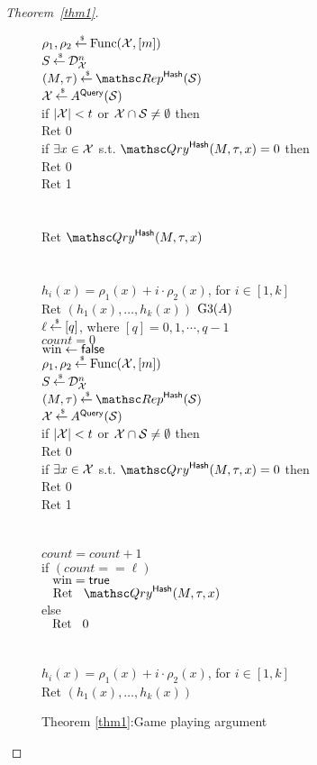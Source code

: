 \begin{proof}[Theorem~\ref{thm1}]
\begin{figure}
{{$\rho_1,\rho_2 {\:\stackrel{{\scriptscriptstyle \hspace{0.2em}\$}} {\leftarrow}\:} \mathrm{Func}({\cal X},[m])$\\
$S {\:\stackrel{{\scriptscriptstyle \hspace{0.2em}\$}} {\leftarrow}\:} \mathcal{D}_{{\cal X}}^{n}$\\
$(M,\tau) \getsr \Rep^{\HashOracle}(\calS)$\\
${\cal X} {\:\stackrel{{\scriptscriptstyle \hspace{0.2em}\$}} {\leftarrow}\:} A^{\mathsf{Query}}({\cal S})$\\
if $|{\cal X}| < t$ or ${\cal X} \cap {\cal S} \neq \emptyset$ then \\
\nudge Ret 0\\
if $\exists x \in {\cal X}$ s.t. $\Qry^{\HashOracle}(M,\tau,x)=0$ then\\
\nudge Ret 0\\
Ret 1\\\\
%
\\
Ret $\Qry^{\HashOracle}(M,\tau,x)$\\\\
%
\\
$h_i(x) = \rho_1(x)+i \cdot \rho_2(x)$, for $i\in[1,k]$\\
Ret $\left(h_1(x),\ldots,h_k(x)\right)$
}
{
\underline{$\text{G3}(A)$}\\
$\ell {\:\stackrel{{\scriptscriptstyle \hspace{0.2em}\$}} {\leftarrow}\:} [q]$, where $[q] = {0,1, \cdots, q-1}$\\
$count = 0$ \\%
$\mathrm{win} \gets \mathsf{false}$\\
$\rho_1,\rho_2 {\:\stackrel{{\scriptscriptstyle \hspace{0.2em}\$}} {\leftarrow}\:} \mathrm{Func}({\cal X},[m])$\\
$S {\:\stackrel{{\scriptscriptstyle \hspace{0.2em}\$}} {\leftarrow}\:} \mathcal{D}_{{\cal X}}^{n}$\\
$(M,\tau) \getsr \Rep^{\HashOracle}(\calS)$\\
${\cal X} {\:\stackrel{{\scriptscriptstyle \hspace{0.2em}\$}} {\leftarrow}\:} A^{\mathsf{Query}}({\cal S})$\\
if $|{\cal X}| < t$ or ${\cal X} \cap {\cal S} \neq \emptyset$ then \\
\nudge Ret 0\\
if $\exists x \in {\cal X}$ s.t. $\Qry^{\HashOracle}(M,\tau,x)=0$ then\\
\nudge Ret 0\\
Ret 1\\\\
%
\\
$count=count +1$\\
if $(count == \ell)$\\
$\hspace*{2ex} \mathrm{win} = \mathsf{true}$\\
$\nudge \mathrm{Ret} \nudge \Qry^{\HashOracle}(M,\tau,x)$\\
else \\
$\hspace*{2ex} \mathrm{Ret}\hspace*{2ex} 0$\\\\
%
\\
$h_i(x) = \rho_1(x)+i \cdot \rho_2(x)$, for $i\in[1,k]$\\
Ret $\left(h_1(x),\ldots,h_k(x)\right)$
}
}
\caption{Theorem \ref{thm1}:Game playing argument}\label{fig:Game}
\end{figure}


\end{proof}
